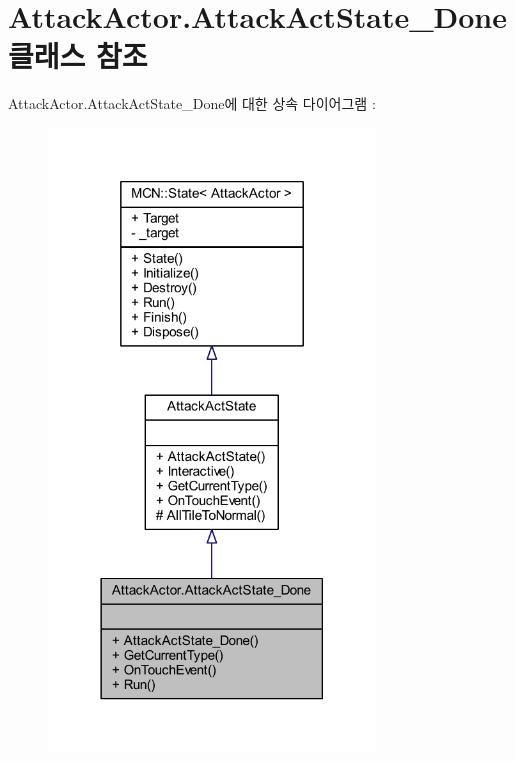 \hypertarget{class_attack_actor_1_1_attack_act_state___done}{}\section{Attack\+Actor.\+Attack\+Act\+State\+\_\+\+Done 클래스 참조}
\label{class_attack_actor_1_1_attack_act_state___done}


Attack\+Actor.\+Attack\+Act\+State\+\_\+\+Done에 대한 상속 다이어그램 \+: 
\nopagebreak
\begin{figure}[H]
\begin{center}
\leavevmode
\includegraphics[width=246pt]{class_attack_actor_1_1_attack_act_state___done__inherit__graph}
\end{center}
\end{figure}


